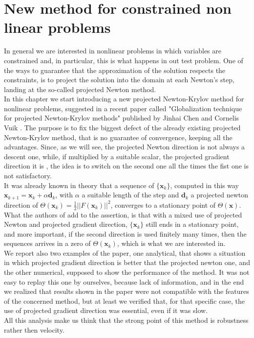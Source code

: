 \chapter{New method for constrained non linear problems}
In general we are interested in nonlinear problems in which variables are constrained and, in particular, this is what happens in out test problem.  One of the ways to guarantee that the approximation of the solution respects the constraints, is to project the solution into the domain at each Newton's step, landing at the so-called projected Newton method.\\
 In this chapter we start introducing a new projected Newton-Krylov method for nonlinear problems, suggested in a recent paper called "Globalization technique for projected Newton-Krylov methods" published by Jinhai Chen and Cornelis Vuik \cite{MAIN}. The purpose is to fix the biggest defect of the already existing projected Newton-Krylov method, that is no guarantee of convergence, keeping all the advantages. Since, as we will see, the projected Newton direction is not always a descent one, while, if multiplied by a suitable scalar, the projected gradient direction it is , the idea is to switch on the second one all the times the fist one is not satisfactory.\\
 It was already known in theory that a sequence of $\{ \textbf{x}_k\} $, computed in this way $ \textbf{x}_{k+1} = \textbf{x}_{k} + \alpha \textbf{d}_k $, with $ \alpha $ a suitable length of the step and $ \textbf{d}_k $ a projected newton direction of $ \Theta (\textbf{x}_k) = \frac{1}{2} ||F (\textbf{x}_k)||^2$, converges to a stationary point of $ \Theta (\textbf{x}) $. What the authors of \cite{MAIN} add to the assertion, is that with a mixed use of projected Newton and projected gradient direction, $ \{\textbf{x}_k\} $ still ends in a stationary point, and more important, if the second direction is used finitely many times, then the sequences arrives in a zero of $ \Theta(\textbf{x}_k) $, which is what we are interested in.\\
 We report also two examples of the paper, one analytical, that shows a situation in which projected gradient direction is better that the projected newton one, and the other numerical, supposed to show the performance of the method. It was not easy to replay this one by ourselves, because lack of information, and in the end we realized that results shown in the paper were not compatible with the features of the concerned method, but at least we verified that, for that specific case, the use of projected gradient direction was essential, even if it was slow.\\
 All this analysis make us think that the strong point of this method is robustness rather then velocity.   

